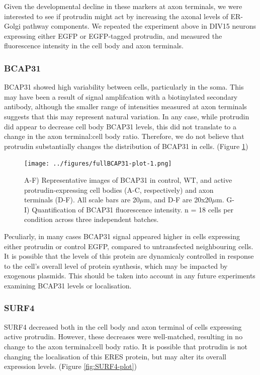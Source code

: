 \documentclass[
  12pt,
  a4paper,
]{book}
\begin{document}
Given the developmental decline in these markers at axon terminals, we were interested to see if protrudin might act by increasing the axonal levels of ER-Golgi pathway components. We repeated the experiment above in DIV15 neurons expressing either EGFP or EGFP-tagged protrudin, and measured the fluorescence intensity in the cell body and axon terminals.

\hypertarget{bcap31}{%
\subsubsection{BCAP31}\label{bcap31}}

BCAP31 showed high variability between cells, particularly in the soma. This may have been a result of signal amplifcation with a biotinylated secondary antibody, although the smaller range of intensities measured at axon terminals suggests that this may represent natural variation. In any case, while protrudin did appear to decrease cell body BCAP31 levels, this did not translate to a change in the axon terminal:cell body ratio. Therefore, we do not believe that protrudin substantially changes the distribution of BCAP31 in cells. (Figure \ref{fig:BCAP31-plot})

\begin{figure}
\centering
\texttt{[image: ../figures/fullBCAP31-plot-1.png]}
\caption{\label{fig:BCAP31-plot}A-F) Representative images of BCAP31 in control, WT, and active protrudin-expressing cell bodies (A-C, respectively) and axon terminals (D-F). All scale bars are 20\(\mu\)m, and D-F are 20x20\(\mu\)m. G-I) Quantification of BCAP31 fluorescence intensity. n = 18 cells per condition across three independent batches.}
\end{figure}

Peculiarly, in many cases BCAP31 signal appeared higher in cells expressing either protrudin or control EGFP, compared to untransfected neighbouring cells. It is possible that the levels of this protein are dynamicaly controlled in response to the cell's overall level of protein synthesis, which may be impacted by exogenous plasmids. This should be taken into account in any future experiments examining BCAP31 levels or localisation.

\hypertarget{surf4}{%
\subsubsection{SURF4}\label{surf4}}

SURF4 decreased both in the cell body and axon terminal of cells expressing active protrudin. However, these decreases were well-matched, resulting in no change to the axon terminal:cell body ratio. It is possible that protrudin is not changing the localisation of this ERES protein, but may alter its overall expression levels. (Figure \ref{fig:SURF4-plot})
\end{document}
